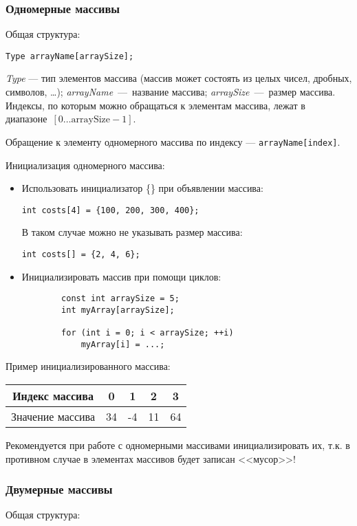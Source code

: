 \subsubsection{Одномерные массивы}
Общая структура:

\lstinline|Type arrayName[arraySize];|

\textit{Type} --- тип элементов массива
(массив может состоять из целых чисел, дробных, символов, \ldots);
\textit{arrayName}~---~название массива; \textit{arraySize}~---~размер
массива. Индексы, по которым можно обращаться к элементам массива,
лежат в диапазоне~$\left[ 0 \ldots \text{arraySize} - 1 \right]$.

Обращение к элементу одномерного массива по индексу --- \texttt{arrayName[index]}.

Инициализация одномерного массива:
\begin{itemize}
    \item Использовать инициализатор \{\} при объявлении массива:

    \lstinline|int costs[4] = {100, 200, 300, 400};|

    В таком случае можно не указывать размер массива:
    
    \lstinline|int costs[] = {2, 4, 6};|
    
    \item Инициализировать массив при помощи циклов:
    \begin{lstlisting}
        const int arraySize = 5;
        int myArray[arraySize];

        for (int i = 0; i < arraySize; ++i)
            myArray[i] = ...;
    \end{lstlisting}
\end{itemize}

Пример инициализированного массива:

\begin{table}[h]
    \begin{tabular}{|c|c|c|c|c|}
      \hline
      Индекс массива & 0 & 1 & 2 & 3 \\
      \hline
      Значение массива & 34 & -4 & 11 & 64 \\
      \hline
    \end{tabular}
\end{table}

Рекомендуется при работе с одномерными массивами инициализировать их, т.к. в противном случае в элементах массивов будет записан <<мусор>>!

\subsubsection{Двумерные массивы}
Общая структура:


